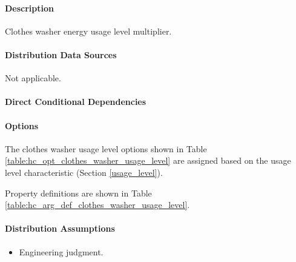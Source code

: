 \paragraph{Description}
% 
Clothes washer energy usage level multiplier.

\paragraph{Distribution Data Sources}
% 
Not applicable.

\paragraph{Direct Conditional Dependencies}


\paragraph{Options}
The clothes washer usage level options shown in Table \ref{table:hc_opt_clothes_washer_usage_level} are assigned based on the usage level characteristic (Section \ref{usage_level}).



Property definitions are shown in Table \ref{table:hc_arg_def_clothes_washer_usage_level}.



\paragraph{Distribution Assumptions}
% 
\begin{itemize}
\item 
Engineering judgment.
\end{itemize}
